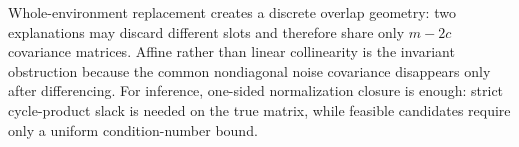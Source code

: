 Whole-environment replacement creates a discrete overlap geometry: two explanations may discard different slots and therefore share only \(m-2c\) covariance matrices. Affine rather than linear collinearity is the invariant obstruction because the common nondiagonal noise covariance disappears only after differencing. For inference, one-sided normalization closure is enough: strict cycle-product slack is needed on the true matrix, while feasible candidates require only a uniform condition-number bound.